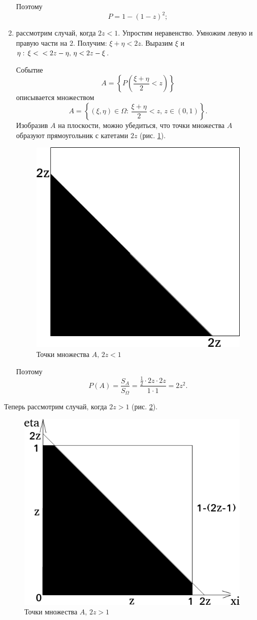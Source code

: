 \begin{enumerate}[label=\alph*)]
Поэтому
$$P =
1 - \left( 1-z \right)^2;$$

\item рассмотрим случай, когда $2z < 1$.
Упростим неравенство. Умножим левую и правую части на $2$.
Получим: $ \xi + \eta < 2z$.
Выразим $ \xi $ и $ \eta: \, \xi < \\ < 2z - \eta, \, \eta < 2z - \xi $.

Событие
$$A =
\left\{ P \left( \frac{ \xi + \eta }{2} < z \right) \right\} $$
описывается множеством
$$A =
\left\{ \left( \xi, \eta \right) \in \Omega: \,
\frac{ \xi + \eta }{2} < z, \,
z \in \left( 0, 1 \right) \right\}.$$
Изобразив $A$ на плоскости, можно убедиться, что точки множества $A$ образуют прямоугольник с катетами $2z$ (рис. \ref{fig:452}).

\begin{figure}[h!]
  \centering
  \includegraphics[width=.4\textwidth]{./pictures/4_5_2.png}
  \caption{Точки множества $A, \, 2z < 1$}
  \label{fig:452}
\end{figure}

Поэтому
$$P \left( A \right) =
\frac{S_A}{S_{ \Omega }} =
\frac{ \frac{1}{2} \cdot 2z \cdot 2z}{1 \cdot 1} =
2z^2.$$
\end{enumerate}

Теперь рассмотрим случай, когда $2z > 1$ (рис. \ref{fig:453}).

\begin{figure}[h!]
  \centering
  \includegraphics[width=.4\textwidth]{./pictures/4_5_3.png}
  \caption{Точки множества $A, \, 2z > 1$}
  \label{fig:453}
\end{figure}

